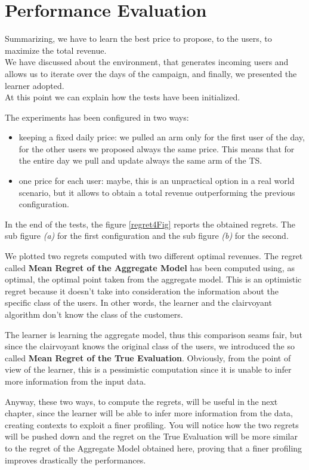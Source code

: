 \section{Performance Evaluation}

Summarizing, we have to learn the best price to propose, to the users, to maximize the total revenue.\\
We have discussed about the environment, that generates incoming users and allows us to iterate over the days of the campaign, and finally, we presented the learner adopted.\\
At this point we can explain how the tests have been initialized.

The experiments has been configured in two ways:
\begin{itemize}
    \item keeping a fixed daily price: we pulled an arm only for the first user of the day, for the other users we proposed always the same price. This means that for the entire day we pull and update always the same arm of the TS.
    \item one price for each user: maybe, this is an unpractical option in a real world scenario, but it allows to obtain a total revenue outperforming the previous configuration.
\end{itemize}

In the end of the tests, the figure \ref{regret4Fig} reports the obtained regrets. The sub figure \textit{(a)} for the first configuration and the sub figure \textit{(b)} for the second.

We plotted two regrets computed with two different optimal revenues.
The regret called \textbf{Mean Regret of the Aggregate Model} has been computed using, as optimal, the optimal point taken from the aggregate model. This is an optimistic regret because it doesn't take into consideration the information about the specific class of the users. In other words, the learner and the clairvoyant algorithm don't know the class of the customers.

The learner is learning the aggregate model, thus this comparison seams fair, but since the clairvoyant knows the original class of the users, we introduced the so called \textbf{Mean Regret of the True Evaluation}. Obviously, from the point of view of the learner, this is a pessimistic computation since it is unable to infer more information from the input data.

Anyway, these two ways, to compute the regrets, will be useful in the next chapter, since the learner will be able to infer more information from the data, creating contexts to exploit a finer profiling.
You will notice how the two regrets will be pushed down and the regret on the True Evaluation will be more similar to the regret of the Aggregate Model obtained here, proving that a finer profiling improves drastically the performances.


